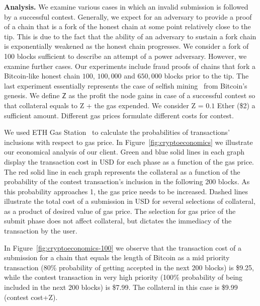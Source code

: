 \noindent \textbf{Analysis.} We examine various cases in which an invalid
submission is followed by a successful contest. Generally, we expect for an
adversary to provide a proof of a chain that is a fork of the honest chain at
some point relatively close to the tip. This is due to the fact that the
ability of an adversary to sustain a fork chain is exponentially weakened as
the honest chain progresses. We consider a fork of 100 blocks sufficient to
describe an attempt of a power adversary. However, we examine further cases.
Our experiments include fraud proofs of chains that fork a Bitcoin-like honest
chain $100$, $100{,}000$ and $650{,}000$ blocks prior to the tip. The last
experiment essentially represents the case of selfish mining~\cite{selfish} from
Bitcoin's genesis.  We define $\textsf{Z}$ as the profit the node gains in case
of a successful contest so that collateral equals to \textsf{Z} + the gas
expended. We consider \textsf{Z} = $0.1$ Ether (\$2) a sufficient amount.
Different gas prices formulate different costs for contest.

We used ETH Gas Station~\cite{eth-gas-station} to calculate the probabilities
of transactions' inclusions with respect to gas price. In
Figure~\ref{fig:cryptoeconomics} we illustrate our economical analysis of our
client. Green and blue solid lines in each graph display the transaction cost
in USD for each phase as a function of the gas price. The red solid line in
each graph represents the collateral as a function of the probability of the
contest transaction's inclusion in the following 200 blocks. As this
probability approaches 1, the gas price needs to be increased. Dashed lines
illustrate the total cost of a submission in USD for several selections of
collateral, as a product of desired value of gas price. The selection for gas
price of the submit phase does not affect collateral, but dictates the
immediacy of the transaction by the user.

In Figure~\ref{fig:cryptoeconomics-100} we observe that the transaction cost of
a submission for a chain that equals the length of Bitcoin as a mid priority
transaction (80\% probability of getting accepted in the next 200 blocks) is
\$9.25, while the contest transaction in very high priority (100\% probability
of being included in the next 200 blocks) is \$7.99. The collateral in this
case is \$9.99 (contest cost+\textsf{Z}).

